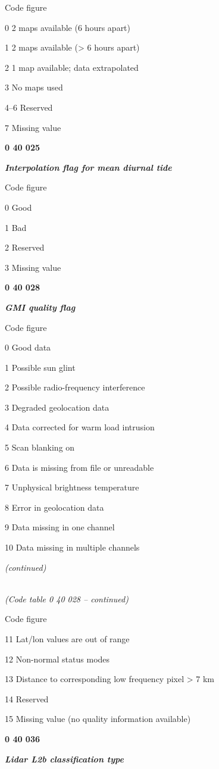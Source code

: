 Code figure

0 2 maps available (6 hours apart)

1 2 maps available (\textgreater{} 6 hours apart)

2 1 map available; data extrapolated

3 No maps used

4--6 Reserved

7 Missing value

\textbf{0 40 025}

\emph{\textbf{Interpolation flag for mean diurnal tide}}

Code figure

0 Good

1 Bad

2 Reserved

3 Missing value

\textbf{0 40 028}

\emph{\textbf{GMI quality flag}}

Code figure

0 Good data

1 Possible sun glint

2 Possible radio-frequency interference

3 Degraded geolocation data

4 Data corrected for warm load intrusion

5 Scan blanking on

6 Data is missing from file or unreadable

7 Unphysical brightness temperature

8 Error in geolocation data

9 Data missing in one channel

10 Data missing in multiple channels

\emph{(continued)}

\emph{\\
(Code table 0 40 028 -- continued)}

Code figure

11 Lat/lon values are out of range

12 Non-normal status modes

13 Distance to corresponding low frequency pixel \textgreater{} 7 km

14 Reserved

15 Missing value (no quality information available)

\textbf{0 40 036}

\emph{\textbf{Lidar L2b classification type}}

